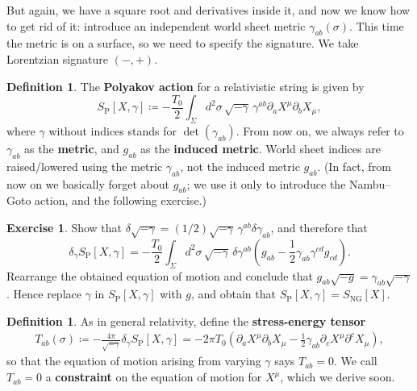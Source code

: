\documentclass{report}
\theoremstyle{plain}
\theoremstyle{definition}
\newtheorem{definition}[theorem]{Definition}
\newtheorem{exercise}{Exercise}[section]
\theoremstyle{remark}
\newcommand{\di}{\partial}
\begin{document}
But again, we have a square root and derivatives inside it, and now we
know how to get rid of it: introduce an independent world sheet metric
$\gamma_{ab}(\sigma)$. This time the metric is on a surface, so
we need to specify the signature. We take Lorentzian signature $(-,
+)$.

\begin{definition}
  The {\bf Polyakov action} for a relativistic string is given by
  \[ S_{\text{P}}[X, \gamma] \coloneqq -\frac{T_0}{2} \int_\Sigma d^2\sigma \, \sqrt{-\gamma} \, \gamma^{ab} \di_a X^\mu \di_b X_\mu, \]
  where $\gamma$ without indices stands for $\det(\gamma_{ab})$. From
  now on, we always refer to $\gamma_{ab}$ as the {\bf metric}, and
  $g_{ab}$ as the {\bf induced metric}. World sheet indices are
  raised/lowered using the metric $\gamma_{ab}$, not the induced
  metric $g_{ab}$. (In fact, from now on we basically forget about
  $g_{ab}$; we use it only to introduce the Nambu--Goto action, and
  the following exercise.)
\end{definition}

\begin{exercise}
  Show that $\delta \sqrt{-\gamma} = (1/2)\sqrt{-\gamma} \,
  \gamma^{ab} \delta \gamma_{ab}$, and therefore that
  \[ \delta_\gamma S_{\text{P}}[X, \gamma] = -\frac{T_0}{2} \int_\Sigma d^2\sigma \, \sqrt{-\gamma} \, \delta \gamma^{ab} \left(g_{ab} - \frac{1}{2} \gamma_{ab} \gamma^{cd} g_{cd}\right). \]
  Rearrange the obtained equation of motion and conclude that
  $g_{ab}\sqrt{-g} = \gamma_{ab}\sqrt{-\gamma}$. Hence replace
  $\gamma$ in $S_{\text{P}}[X, \gamma]$ with $g$, and obtain that
  $S_{\text{P}}[X, \gamma] = S_{\text{NG}}[X]$.
\end{exercise}

\begin{definition}
  As in general relativity, define the {\bf stress-energy tensor}
  \begin{align}
      \label{stressenergydefn}
      T_{ab}(\sigma) \coloneqq -\frac{4\pi}{\sqrt{-\gamma}} \delta_{\gamma}
      S_{\text{P}}[X, \gamma] = -2\pi T_0 \left(\di_a X^\mu \di_b X_\mu -
      \frac{1}{2} \gamma_{ab} \di_c X^\mu \di^c X_\mu\right),\end{align}
  so that the equation of motion arising from varying $\gamma$ says
  $T_{ab} = 0$. We call $T_{ab} = 0$ a {\bf constraint} on the
  equation of motion for $X^\mu$, which we derive soon.
\end{definition}
\end{document}
